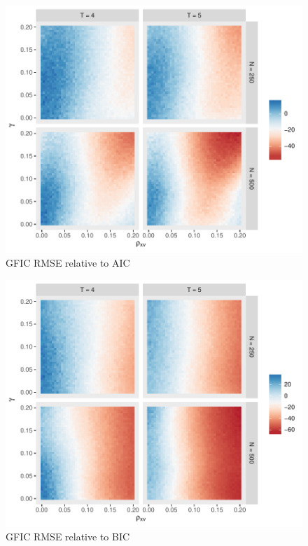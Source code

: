 \begin{figure}
\centering
\includegraphics[scale = 0.8]{./simulations/DynamicPanel/results/Dpanel_GFIC_RMSE_rel_AIC}
\caption{GFIC RMSE relative to AIC}
\end{figure}
\begin{figure}
\centering
\includegraphics[scale = 0.8]{./simulations/DynamicPanel/results/Dpanel_GFIC_RMSE_rel_BIC}
\caption{GFIC RMSE relative to BIC}
\end{figure}
